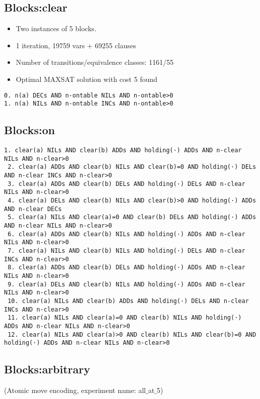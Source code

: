 \documentclass[a4paper]{article}
\begin{document}
\subsection{Blocks:clear}
\begin{itemize}
 \item Two instances of 5 blocks.
 \item 1 iteration, 19759 vars + 69255 clauses
 \item Number of transitions/equivalence classes: 1161/55
 \item Optimal MAXSAT solution with cost 5 found
\end{itemize}



\begin{Verbatim}[fontsize=\footnotesize]
0. n(a) DECs AND n-ontable NILs AND n-ontable>0
1. n(a) NILs AND n-ontable INCs AND n-ontable>0
\end{Verbatim}


\subsection{Blocks:on}
\begin{Verbatim}[fontsize=\footnotesize]
 1. clear(a) NILs AND clear(b) ADDs AND holding(·) ADDs AND n-clear NILs AND n-clear>0
 2. clear(a) ADDs AND clear(b) NILs AND clear(b)=0 AND holding(·) DELs AND n-clear INCs AND n-clear>0
 3. clear(a) ADDs AND clear(b) DELs AND holding(·) DELs AND n-clear NILs AND n-clear>0
 4. clear(a) DELs AND clear(b) NILs AND clear(b)>0 AND holding(·) ADDs AND n-clear DECs
 5. clear(a) NILs AND clear(a)=0 AND clear(b) DELs AND holding(·) ADDs AND n-clear NILs AND n-clear>0
 6. clear(a) ADDs AND clear(b) NILs AND holding(·) ADDs AND n-clear NILs AND n-clear>0
 7. clear(a) NILs AND clear(b) NILs AND holding(·) DELs AND n-clear INCs AND n-clear>0
 8. clear(a) ADDs AND clear(b) DELs AND holding(·) ADDs AND n-clear NILs AND n-clear>0
 9. clear(a) DELs AND clear(b) NILs AND holding(·) ADDs AND n-clear NILs AND n-clear>0
 10. clear(a) NILs AND clear(b) ADDs AND holding(·) DELs AND n-clear INCs AND n-clear>0
 11. clear(a) NILs AND clear(a)=0 AND clear(b) NILs AND holding(·) ADDs AND n-clear NILs AND n-clear>0
 12. clear(a) NILs AND clear(a)>0 AND clear(b) NILs AND clear(b)=0 AND holding(·) ADDs AND n-clear NILs AND n-clear>0
\end{Verbatim}

\subsection{Blocks:arbitrary}
(Atomic move encoding, experiment name: all$\_$at$\_$5)
\end{document}
